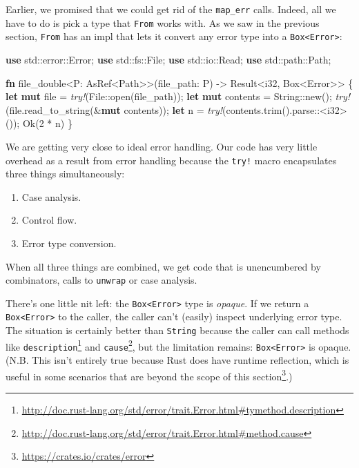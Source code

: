 \documentclass[a4paper,]{book}
\newenvironment{Shaded}{\begin{snugshade}}{\end{snugshade}}
\newcommand{\KeywordTok}[1]{\textcolor[rgb]{0.13,0.29,0.53}{\textbf{{#1}}}}
\newcommand{\DataTypeTok}[1]{\textcolor[rgb]{0.13,0.29,0.53}{{#1}}}
\newcommand{\DecValTok}[1]{\textcolor[rgb]{0.00,0.00,0.81}{{#1}}}
\newcommand{\ConstantTok}[1]{\textcolor[rgb]{0.00,0.00,0.00}{{#1}}}
\newcommand{\PreprocessorTok}[1]{\textcolor[rgb]{0.56,0.35,0.01}{\textit{{#1}}}}
\newcommand{\NormalTok}[1]{{#1}}
\renewcommand{\href}[2]{#2\footnote{\url{#1}}}
\providecommand{\tightlist}{%
  \setlength{\itemsep}{0pt}\setlength{\parskip}{0pt}}
\begin{document}
Earlier, we promised that we could get rid of the \texttt{map\_err}
calls. Indeed, all we have to do is pick a type that \texttt{From} works
with. As we saw in the previous section, \texttt{From} has an impl that
lets it convert any error type into a
\texttt{Box\textless{}Error\textgreater{}}:

\begin{Shaded}
\begin{Highlighting}[]
\KeywordTok{use} \NormalTok{std::error::Error;}
\KeywordTok{use} \NormalTok{std::fs::File;}
\KeywordTok{use} \NormalTok{std::io::Read;}
\KeywordTok{use} \NormalTok{std::path::Path;}

\KeywordTok{fn} \NormalTok{file_double<P: AsRef<Path>>(file_path: P) -> }\DataTypeTok{Result}\NormalTok{<}\DataTypeTok{i32}\NormalTok{, }\DataTypeTok{Box}\NormalTok{<Error>> \{}
    \KeywordTok{let} \KeywordTok{mut} \NormalTok{file = }\PreprocessorTok{try!}\NormalTok{(File::open(file_path));}
    \KeywordTok{let} \KeywordTok{mut} \NormalTok{contents = }\DataTypeTok{String}\NormalTok{::new();}
    \PreprocessorTok{try!}\NormalTok{(file.read_to_string(&}\KeywordTok{mut} \NormalTok{contents));}
    \KeywordTok{let} \NormalTok{n = }\PreprocessorTok{try!}\NormalTok{(contents.trim().parse::<}\DataTypeTok{i32}\NormalTok{>());}
    \ConstantTok{Ok}\NormalTok{(}\DecValTok{2} \NormalTok{* n)}
\NormalTok{\}}
\end{Highlighting}
\end{Shaded}

We are getting very close to ideal error handling. Our code has very
little overhead as a result from error handling because the
\texttt{try!} macro encapsulates three things simultaneously:

\begin{enumerate}
\def\labelenumi{\arabic{enumi}.}
\tightlist
\item
  Case analysis.
\item
  Control flow.
\item
  Error type conversion.
\end{enumerate}

When all three things are combined, we get code that is unencumbered by
combinators, calls to \texttt{unwrap} or case analysis.

There's one little nit left: the
\texttt{Box\textless{}Error\textgreater{}} type is \emph{opaque}. If we
return a \texttt{Box\textless{}Error\textgreater{}} to the caller, the
caller can't (easily) inspect underlying error type. The situation is
certainly better than \texttt{String} because the caller can call
methods like
\href{http://doc.rust-lang.org/std/error/trait.Error.html\#tymethod.description}{\texttt{description}}
and
\href{http://doc.rust-lang.org/std/error/trait.Error.html\#method.cause}{\texttt{cause}},
but the limitation remains: \texttt{Box\textless{}Error\textgreater{}}
is opaque. (N.B. This isn't entirely true because Rust does have runtime
reflection, which is useful in some scenarios that are
\href{https://crates.io/crates/error}{beyond the scope of this
section}.)
\end{document}
